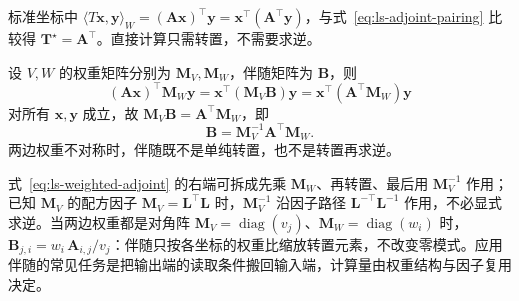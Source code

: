 标准坐标中 $\langle T\bm x,\bm y\rangle_W=(\bm A\bm x)^\top\bm y=\bm x^\top(\bm A^\top\bm y)$，与式~\eqref{eq:ls-adjoint-pairing} 比较得 $\bm T^\star=\bm A^\top$。直接计算只需转置，不需要求逆。

设 $V,W$ 的权重矩阵分别为 $\bm M_V,\bm M_W$，伴随矩阵为 $\bm B$，则
\[
 (\bm A\bm x)^\top\bm M_W\bm y=\bm x^\top(\bm M_V\bm B)\bm y
 =\bm x^\top(\bm A^\top\bm M_W)\bm y
 \]
对所有 $\bm x,\bm y$ 成立，故 $\bm M_V\bm B=\bm A^\top\bm M_W$，即
\begin{equation}
 \bm B=\bm M_V^{-1}\bm A^\top\bm M_W.
 \label{eq:ls-weighted-adjoint}
\end{equation}
两边权重不对称时，伴随既不是单纯转置，也不是转置再求逆。

式~\eqref{eq:ls-weighted-adjoint} 的右端可拆成先乘 $\bm M_W$、再转置、最后用 $\bm M_V^{-1}$ 作用；已知 $\bm M_V$ 的配方因子 $\bm M_V=\bm L^\top\bm L$ 时，$\bm M_V^{-1}$ 沿因子路径 $\bm L^{-\top}\bm L^{-1}$ 作用，不必显式求逆。当两边权重都是对角阵 $\bm M_V=\operatorname{diag}(v_j)$、$\bm M_W=\operatorname{diag}(w_i)$ 时，$\bm B_{j,i}=w_i\,\bm A_{i,j}/v_j$：伴随只按各坐标的权重比缩放转置元素，不改变零模式。应用伴随的常见任务是把输出端的读取条件搬回输入端，计算量由权重结构与因子复用决定。
